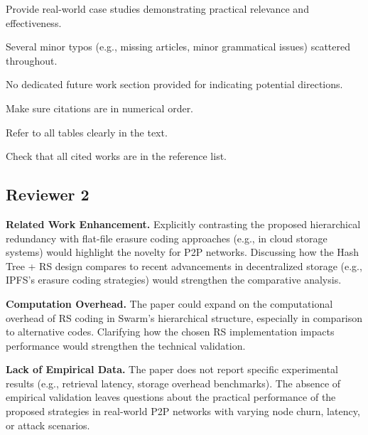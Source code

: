 \documentclass[11pt]{article}
\newcommand{\us}{\rm \setlength{\leftskip}{0.3cm} \setlength{\rightskip}{0.3cm}}
\newcommand{\them}{\it \setlength{\leftskip}{0cm} \setlength{\rightskip}{0cm}}
\begin{document}
\us

\them

Provide real-world case studies demonstrating practical relevance and effectiveness.

\us

\them

Several minor typos (e.g., missing articles, minor grammatical
issues) scattered throughout.

\us

\them

No dedicated future work section provided for indicating potential directions.

\us

\them

Make sure citations are in numerical order.

\us

\them

Refer to all tables clearly in the text.

\us

\them

Check that all cited works are in the reference list.

\us

\them


\subsection*{Reviewer 2}

\textbf{Related Work Enhancement.} Explicitly contrasting the proposed hierarchical redundancy with flat-file erasure coding approaches (e.g., in cloud storage systems) would highlight the novelty for P2P networks. Discussing how the Hash Tree + RS design compares to recent advancements in decentralized storage (e.g., IPFS's erasure coding strategies) would strengthen the comparative analysis.

\us

\them

\textbf{Computation Overhead.} The paper could expand on the computational overhead of RS coding in Swarm's hierarchical structure, especially in comparison to alternative codes. Clarifying how the chosen RS implementation impacts performance would strengthen the technical validation.

\us

\them

\textbf{Lack of Empirical Data.} The paper does not report specific experimental results (e.g., retrieval latency, storage overhead benchmarks). The absence of empirical validation leaves questions about the practical performance of the proposed strategies in real-world P2P networks with varying node churn, latency, or attack scenarios.
\end{document}
